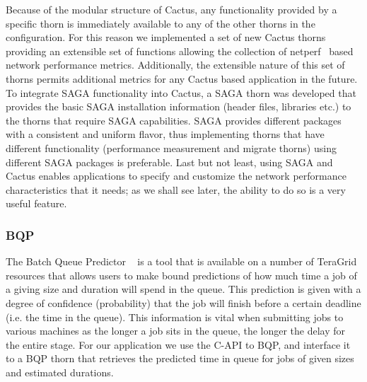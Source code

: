 \documentclass[conference,final]{IEEEtran}
\newcommand{\CC}{\ccomment}
\begin{document}
Because of the modular structure of Cactus, any functionality provided
by a specific thorn is immediately available to any of the other
thorns in the configuration. For this reason we implemented a set of
new Cactus thorns providing an extensible set of functions allowing
the collection of netperf~\cite{netperf_web} based network performance
metrics. Additionally, the extensible nature of this set of thorns
permits additional metrics for any Cactus based application in the
future.  To integrate SAGA functionality into Cactus, a SAGA thorn was
developed that provides the basic SAGA installation information
(header files, libraries etc.)  to the thorns that require SAGA
capabilities.  SAGA provides different packages with a consistent and
uniform flavor, thus implementing thorns that have different
functionality (performance measurement and migrate thorns) using
different SAGA packages is preferable. Last but not least, using SAGA
and Cactus enables applications to specify and customize the network
performance characteristics that it needs; as we shall see later, the
ability to do so is a very useful feature.


\subsubsection{BQP} The Batch Queue Predictor ~\cite{bqp} is a tool
that is available on a number of TeraGrid resources that allows users
to make bound predictions of how much time a job of a giving size and
duration will spend in the queue.  This prediction is given with a
degree of confidence (probability) that the job will finish before a
certain deadline (i.e. the time in the queue).  This information is
vital when submitting jobs to various machines as the longer a job
sits in the queue, the longer the delay for the entire stage.  For our
application we use the C-API to BQP, and interface it to a BQP thorn
that retrieves the predicted time in queue for jobs of given sizes and
estimated durations.


\end{document}
